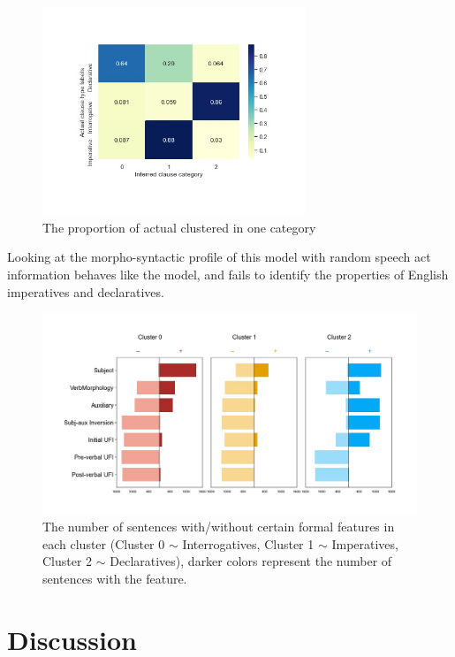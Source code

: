\begin{figure}[H]
    \centering
    \includegraphics[width=0.7\textwidth]{figures/noisy100-heatrev.jpg}
    \caption{The proportion of actual \diis{} clustered in one category}
    \label{fig:noisy100-heatrev}
\end{figure}

Looking at the morpho-syntactic profile of this model with random speech act information behaves like the \dlearnerabbr{} model, and fails to identify the properties of English imperatives and declaratives.

\begin{figure}[H]
    \centering
    \includegraphics[width=1\textwidth]{figures/noisy100-syncluster.jpg}
    \caption{The number of sentences with/without certain formal features in each cluster (Cluster 0 $\sim$ Interrogatives, Cluster 1 $\sim$ Imperatives, Cluster 2 $\sim$ Declaratives), darker colors represent the number of sentences with the feature.}
    \label{fig:noisy100-syncluster}
\end{figure}


\section{Discussion}
\label{sec:mancl:discussion}




